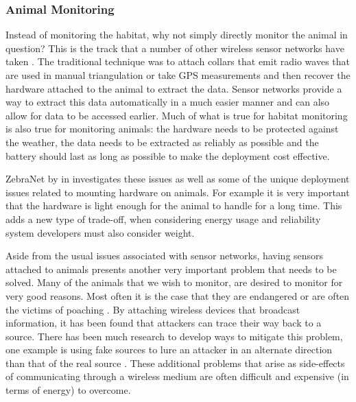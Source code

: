 \subsubsection*{Animal Monitoring}

Instead of monitoring the habitat, why not simply directly monitor the animal in question? This is the track that a number of other wireless sensor networks have taken \cite{Juang:2002:ECW:635508.605408}. The traditional technique was to attach collars that emit radio waves that are used in manual triangulation or take GPS measurements and then recover the hardware attached to the animal to extract the data. Sensor networks provide a way to extract this data automatically in a much easier manner and can also allow for data to be accessed earlier.   Much of what is true for habitat monitoring is also true for monitoring animals: the hardware needs to be protected against the weather, the data needs to be extracted as reliably as possible and the battery should last as long as possible to make the deployment cost effective.

ZebraNet by \citeauthor{Juang:2002:ECW:635508.605408} in \cite{Juang:2002:ECW:635508.605408} investigates these issues as well as some of the unique deployment issues related to mounting hardware on animals. For example it is very important that the hardware is light enough for the animal to handle for a long time. This adds a new type of trade-off, when considering energy usage and reliability system developers must also consider weight.

Aside from the usual issues associated with sensor networks, having sensors attached to animals presents another very important problem that needs to be solved. Many of the animals that we wish to monitor, are desired to monitor for very good reasons. Most often it is the case that they are endangered or are often the victims of poaching \cite{?}. By attaching wireless devices that broadcast information, it has been found that attackers can trace their way back to a source. There has been much research to develop ways to mitigate this problem, one example is using fake sources to lure an attacker in an alternate direction than that of the real source \cite{Ozturk:2004:SPE:1029102.1029117,Kamat.1437121,6296046}. These additional problems that arise as side-effects of communicating through a wireless medium are often difficult and expensive (in terms of energy) to overcome.

